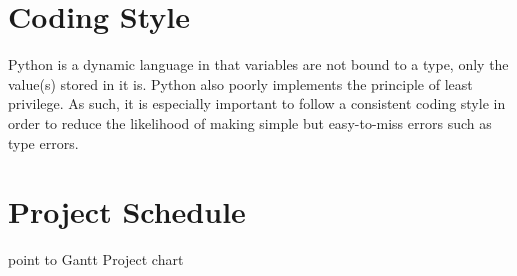 \documentclass{article}
\begin{document}
\section{Coding Style} 

\noindent Python is a dynamic language in that variables are not bound to a
type, only the value(s) stored in it is. Python also poorly implements the
principle of least privilege. As such, it is especially important to follow a
consistent coding style in order to reduce the likelihood of making simple but
easy-to-miss errors such as type errors.

\section{Project Schedule} 

\noindent

point to Gantt Project chart
\end{document}
